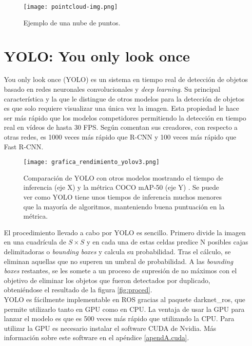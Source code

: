 \begin{figure}[h]
	\begin{center} 
		\texttt{[image: pointcloud-img.png]}
	\end{center}
	\caption{Ejemplo de una nube de puntos. \cite{pointcloud_paper}}
	\label{fig:pc}
\end{figure}

\section{YOLO: You only look once}

You only look once (YOLO) es un sistema en tiempo real de detección de objetos basado en redes neuronales convolucionales y \textit{deep learning}. Su principal característica y la que le distingue de otros modelos para la detección de objetos es que solo requiere visualizar una única vez la imagen. Esta propiedad le hace ser más rápido que los modelos competidores permitiendo la detección en tiempo real en vídeos de hasta 30 FPS. Según comentan sus creadores, con respecto a otras redes, es 1000 veces más rápido que R-CNN y 100 veces más rápido que Fast R-CNN.  \cite{yolo} \\

\begin{figure}[h]
	\begin{center} 
		\texttt{[image: grafica\_rendimiento\_yolov3.png]}
	\end{center}
	\caption{Comparación de YOLO con otros modelos mostrando el tiempo de inferencia (eje X) y la métrica COCO mAP-50 (eje Y) \cite{yolo}. Se puede ver como YOLO tiene unos tiempos de inferencia muchos menores que la mayoría de algoritmos, manteniendo buena puntuación en la métrica.}
	\label{fig:rend}
\end{figure}

El procedimiento llevado a cabo por YOLO es sencillo. Primero divide la imagen en una cuadrícula de $S \times S$ y en cada una de estas celdas predice N posibles cajas delimitadoras o \textit{bounding boxes} y calcula su probabilidad. Tras el cálculo, se eliminan aquellas que no superen un umbral de probabilidad. A las \textit{bounding boxes} restantes, se les somete a un proceso de supresión de no máximos con el objetivo de eliminar los objetos que fueron detectados por duplicado, obteniéndose el resultado de la figura \ref{fig:proced}.\\

YOLO es fácilmente implementable en ROS gracias al paquete darknet\_ros, que permite utilizarlo tanto en GPU como en CPU. La ventaja de usar la GPU para lanzar el modelo es que es 500 veces más rápido que utilizando la CPU. Para utilizar la GPU es necesario instalar el software CUDA de Nvidia. Más información sobre este software en el apéndice \ref{apendA.cuda}.\\

